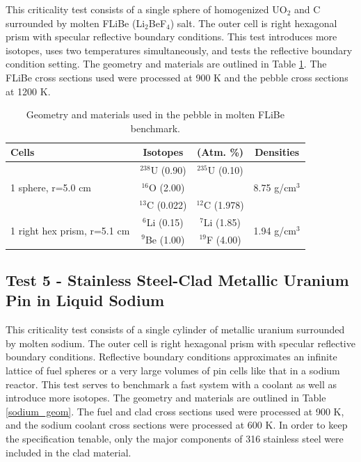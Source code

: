 \documentclass[preprint,12pt]{elsarticle}
\begin{document}
This criticality test consists of a single sphere of homogenized UO$_2$ and C surrounded by molten FLiBe (Li$_2$BeF$_4$) salt.  The outer cell is right hexagonal prism with specular reflective boundary conditions.  This test introduces more isotopes, uses two temperatures simultaneously, and tests the reflective boundary condition setting.  The geometry and materials are outlined in Table \ref{pebble_geom}.  The FLiBe cross sections used were processed at 900 K and the pebble cross sections at 1200 K.

\begin{table}[h]
\centering
\caption{Geometry and materials used in the pebble in molten FLiBe benchmark.}
\label{pebble_geom}
\begin{tabular}{| l | c  c | c |}
\hline
Cells & Isotopes & (Atm.  \%)& Densities \\
\hline
\multirow{3}{*}{1 sphere, r=5.0 cm }  &   $^{238}$U   (0.90) &  $^{235}$U   (0.10) &  \multirow{3}{*}{8.75 g/cm$^3$} \\
                                      &   $^{16}$O    (2.00) &                     &  \\
                                      &   $^{13}$C    (0.022)& $^{12}$C    (1.978) &  \\
\hline
\multirow{2}{*}{1 right hex prism, r=5.1 cm }  &   $^{6}$Li  (0.15) &  $^{7}$Li  (1.85)&  \multirow{2}{*}{1.94 g/cm$^3$} \\
                                               &  $^{9}$Be  (1.00) & $^{19}$F  (4.00) &  \\
\hline
\end{tabular}
\end{table}

\subsection{Test 5 - Stainless Steel-Clad Metallic Uranium Pin in Liquid Sodium}

This criticality test consists of a single cylinder of metallic uranium surrounded by molten sodium.  The outer cell is right hexagonal prism with specular reflective boundary conditions.  Reflective boundary conditions approximates an infinite lattice of fuel spheres or a very large volumes of  pin cells like that in a sodium reactor.  This test serves to benchmark a fast system with a coolant as well as introduce more isotopes.  The geometry and materials are outlined in Table \ref{sodium_geom}.  The fuel and clad cross sections used were processed at 900 K, and the sodium coolant cross sections were processed at 600 K.  In order to keep the specification tenable, only the major components of 316 stainless steel were included in the clad material. 
\end{document}

